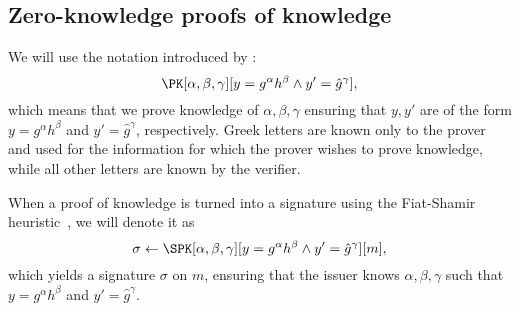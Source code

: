 \subsection{Zero-knowledge proofs of knowledge}%
\label{ZKPK}

We will use the notation introduced by \citet{PKnotation}:
\begin{equation}\label{PKexample}
  \PK[\alpha, \beta, \gamma][y = g^{\alpha} h^{\beta} \land y' = \hat g^{\gamma}],
\end{equation}
which means that we prove knowledge of \(\alpha, \beta, \gamma\) ensuring that \(y, y'\) are of the form \(y = g^{\alpha} h^{\beta}\) and \(y' = \hat g^{\gamma}\), respectively.
Greek letters are known only to the prover and used for the information for which the prover wishes to prove knowledge, while all other letters are known by the verifier.

When a proof of knowledge is turned into a signature using the Fiat-Shamir heuristic~\cite{FiatShamirHeuristic}, we will denote it as
\begin{equation*}\label{SPKexample}
  \sigma\gets \SPK[\alpha, \beta, \gamma]%
  [y = g^{\alpha} h^{\beta} \land y' = \hat g^{\gamma}]%
  [m],
\end{equation*}
which yields a signature \(\sigma\) on \(m\), ensuring that the issuer knows \(\alpha, \beta, \gamma\) such that \(y = g^{\alpha} h^{\beta}\) and \(y' = \hat{g}^{\gamma}\).


